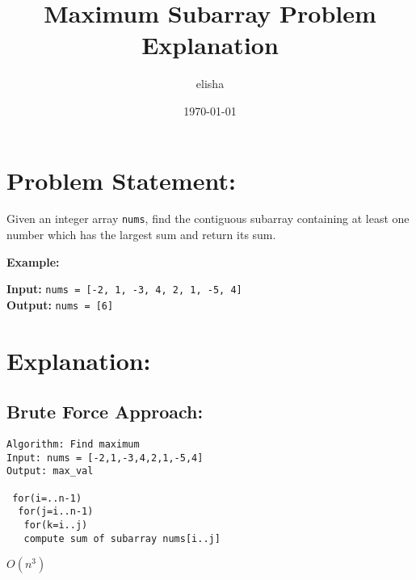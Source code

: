 \documentclass{article}
\title{Maximum Subarray Problem Explanation}
\author{elisha}
\date{\today}
\begin{document}
\maketitle
\section{Problem Statement:}
Given an integer array \texttt{nums}, find the contiguous subarray containing at least one number which has the largest sum and return its sum.
\vspace{1em}

{\large \textbf{Example:}}

\vspace{0.3em} %

\noindent
\textbf{Input:} \texttt{nums = [-2, 1, -3, 4, 2, 1, -5, 4]} \\[0.3em]
\textbf{Output:} \texttt{nums = [6]}
\begin{center}
           
\end{center}
\section{Explanation:}
\subsection{Brute Force Approach:}
\begin{verbatim}
Algorithm: Find maximum
Input: nums = [-2,1,-3,4,2,1,-5,4]
Output: max_val

 for(i=..n-1)
  for(j=i..n-1)
   for(k=i..j)
   compute sum of subarray nums[i..j] 
\end{verbatim}
$O(n^3)$
\end{document}
